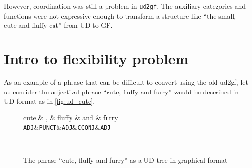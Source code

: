 However, coordination was still a problem in \verb|ud2gf|. The auxiliary categories and functions were not expressive enough to transform a structure like ``the small, cute and fluffy cat'' from UD to GF.





\section{Intro to flexibility problem}

As an example of a phrase that can be difficult to convert using the old ud2gf, let us consider the adjectival phrase ``cute, fluffy and furry''
would be described in UD format as in \autoref{fig:ud_cute}.



\begin{figure}
    \centering
    \begin{dependency}
        \begin{deptext}[column sep=0.4cm]
              cute \& , \& fluffy \& and \& furry \\
            {\tt ADJ}\&{\tt PUNCT}\&{\tt ADJ}\&{\tt CCONJ}\&{\tt ADJ}\\
        \end{deptext}
    \end{dependency} \\
    \caption{The phrase ``cute, fluffy and furry'' as a UD tree in graphical format}
    \label{fig:ud_cute}
\end{figure}
% 

